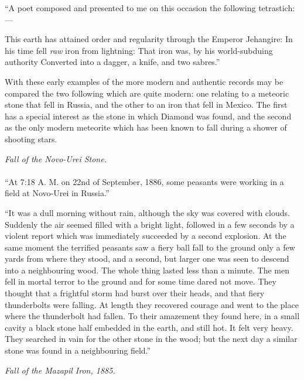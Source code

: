 \documentclass[a4paper, 12pt, oneside]{article}
\begin{document}
``A poet composed and presented to me on this occasion the following tetrastich:---

This earth has attained order and regularity through the Emperor Jehangire: In his time fell \emph{raw} iron from lightning: That iron was, by his world-subduing authority Converted into a dagger, a knife, and two sabres.'' 

With these early examples of the more modern and authentic records may be compared the two following which are quite modern: one relating to a meteoric stone that fell in Russia, and the other to an iron that fell in Mexico. The first has a special interest as the stone in which Diamond was found, and the second as the only modern meteorite which has been known to fall during a shower of shooting stars.
\begin{center}
\emph{Fall of the Novo-Urei Stone.} 
\end{center}
\paragraph{}
``At 7:18 A. M. on 22nd of September, 1886, some peasants were working in a field at Novo-Urei in Russia.''

``It was a dull morning without rain, although the sky was covered with clouds. Suddenly the air seemed filled with a bright light, followed in a few seconds by a violent report which was immediately succeeded by a second explosion. At the same moment the terrified peasants saw a fiery ball fall to the ground only a few yards from where they stood, and a second, but larger one was seen to descend into a neighbouring wood. The whole thing lasted less than a minute. The men fell in mortal terror to the ground and for some time dared not move. They thought that a frightful storm had burst over their heads, and that fiery thunderbolts were falling. At length they recovered courage and went to the place where the thunderbolt had fallen. To their amazement they found here, in a small cavity a black stone half embedded in the earth, and still hot. It felt very heavy. They searched in vain for the other stone in the wood; but the next day a similar stone was found in a neighbouring field.'' 
\begin{center}
\emph{Fall of the Mazapil Iron, 1885.}
\end{center}
\end{document}
